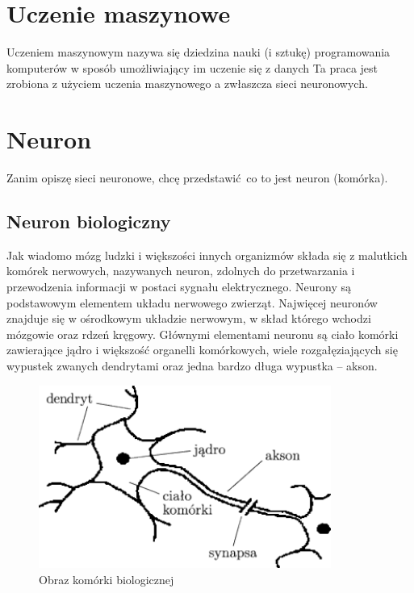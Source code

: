 \documentclass{article}
\begin{document}
\section{Uczenie maszynowe}
Uczeniem maszynowym nazywa się dziedzina nauki (i sztukę) programowania komputerów w sposób umożliwiający im uczenie się z danych \cite{geron} 
Ta praca jest zrobiona z użyciem uczenia maszynowego a zwłaszcza sieci neuronowych.


\section{Neuron}
Zanim opiszę sieci neuronowe, chcę przedstawić co to jest neuron (komórka).

\subsection{Neuron biologiczny}
Jak wiadomo mózg ludzki i większości innych organizmów składa się z malutkich komórek nerwowych, nazywanych neuron, zdolnych do przetwarzania i przewodzenia informacji w postaci sygnału elektrycznego. Neurony są podstawowym elementem układu nerwowego zwierząt. Najwięcej neuronów znajduje się w ośrodkowym układzie nerwowym, w skład którego wchodzi mózgowie oraz rdzeń kręgowy. \cite{neuroscience}
Głównymi elementami neuronu są ciało komórki zawierające jądro i większość organelli komórkowych, wiele rozgałęziających się wypustek zwanych dendrytami oraz jedna bardzo długa wypustka -- akson. \cite{geron}

\begin{figure}[H]
	\centering
	\includegraphics[width=\textwidth,height=6cm,keepaspectratio=true]{neuron_bio}
	\caption{
		Obraz komórki biologicznej \cite{neuron_bio}
	}
\end{figure}
\end{document}
